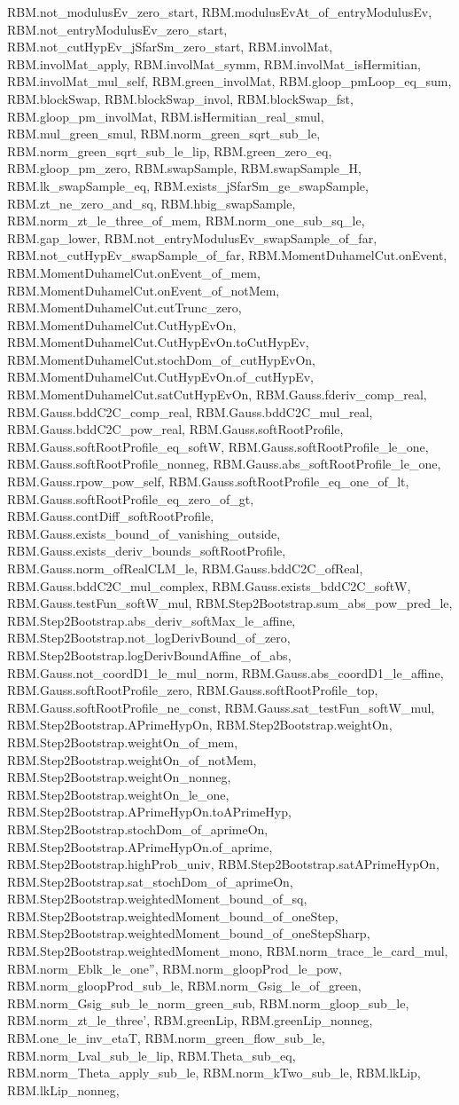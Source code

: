 \begin{theorem}
RBM.not_modulusEv_zero_start, RBM.modulusEvAt_of_entryModulusEv, RBM.not_entryModulusEv_zero_start, RBM.not_cutHypEv_jSfarSm_zero_start, RBM.involMat, RBM.involMat_apply, RBM.involMat_symm, RBM.involMat_isHermitian, RBM.involMat_mul_self, RBM.green_involMat, RBM.gloop_pmLoop_eq_sum, RBM.blockSwap, RBM.blockSwap_invol, RBM.blockSwap_fst, RBM.gloop_pm_involMat, RBM.isHermitian_real_smul, RBM.mul_green_smul, RBM.norm_green_sqrt_sub_le, RBM.norm_green_sqrt_sub_le_lip, RBM.green_zero_eq, RBM.gloop_pm_zero, RBM.swapSample, RBM.swapSample_H, RBM.lk_swapSample_eq, RBM.exists_jSfarSm_ge_swapSample, RBM.zt_ne_zero_and_sq, RBM.hbig_swapSample, RBM.norm_zt_le_three_of_mem, RBM.norm_one_sub_sq_le, RBM.gap_lower, RBM.not_entryModulusEv_swapSample_of_far, RBM.not_cutHypEv_swapSample_of_far, RBM.MomentDuhamelCut.onEvent, RBM.MomentDuhamelCut.onEvent_of_mem, RBM.MomentDuhamelCut.onEvent_of_notMem, RBM.MomentDuhamelCut.cutTrunc_zero, RBM.MomentDuhamelCut.CutHypEvOn, RBM.MomentDuhamelCut.CutHypEvOn.toCutHypEv, RBM.MomentDuhamelCut.stochDom_of_cutHypEvOn, RBM.MomentDuhamelCut.CutHypEvOn.of_cutHypEv, RBM.MomentDuhamelCut.satCutHypEvOn, RBM.Gauss.fderiv_comp_real, RBM.Gauss.bddC2C_comp_real, RBM.Gauss.bddC2C_mul_real, RBM.Gauss.bddC2C_pow_real, RBM.Gauss.softRootProfile, RBM.Gauss.softRootProfile_eq_softW, RBM.Gauss.softRootProfile_le_one, RBM.Gauss.softRootProfile_nonneg, RBM.Gauss.abs_softRootProfile_le_one, RBM.Gauss.rpow_pow_self, RBM.Gauss.softRootProfile_eq_one_of_lt, RBM.Gauss.softRootProfile_eq_zero_of_gt, RBM.Gauss.contDiff_softRootProfile, RBM.Gauss.exists_bound_of_vanishing_outside, RBM.Gauss.exists_deriv_bounds_softRootProfile, RBM.Gauss.norm_ofRealCLM_le, RBM.Gauss.bddC2C_ofReal, RBM.Gauss.bddC2C_mul_complex, RBM.Gauss.exists_bddC2C_softW, RBM.Gauss.testFun_softW_mul, RBM.Step2Bootstrap.sum_abs_pow_pred_le, RBM.Step2Bootstrap.abs_deriv_softMax_le_affine, RBM.Step2Bootstrap.not_logDerivBound_of_zero, RBM.Step2Bootstrap.logDerivBoundAffine_of_abs, RBM.Gauss.not_coordD1_le_mul_norm, RBM.Gauss.abs_coordD1_le_affine, RBM.Gauss.softRootProfile_zero, RBM.Gauss.softRootProfile_top, RBM.Gauss.softRootProfile_ne_const, RBM.Gauss.sat_testFun_softW_mul, RBM.Step2Bootstrap.APrimeHypOn, RBM.Step2Bootstrap.weightOn, RBM.Step2Bootstrap.weightOn_of_mem, RBM.Step2Bootstrap.weightOn_of_notMem, RBM.Step2Bootstrap.weightOn_nonneg, RBM.Step2Bootstrap.weightOn_le_one, RBM.Step2Bootstrap.APrimeHypOn.toAPrimeHyp, RBM.Step2Bootstrap.stochDom_of_aprimeOn, RBM.Step2Bootstrap.APrimeHypOn.of_aprime, RBM.Step2Bootstrap.highProb_univ, RBM.Step2Bootstrap.satAPrimeHypOn, RBM.Step2Bootstrap.sat_stochDom_of_aprimeOn, RBM.Step2Bootstrap.weightedMoment_bound_of_sq, RBM.Step2Bootstrap.weightedMoment_bound_of_oneStep, RBM.Step2Bootstrap.weightedMoment_bound_of_oneStepSharp, RBM.Step2Bootstrap.weightedMoment_mono, RBM.norm_trace_le_card_mul, RBM.norm_Eblk_le_one'', RBM.norm_gloopProd_le_pow, RBM.norm_gloopProd_sub_le, RBM.norm_Gsig_le_of_green, RBM.norm_Gsig_sub_le_norm_green_sub, RBM.norm_gloop_sub_le, RBM.norm_zt_le_three', RBM.greenLip, RBM.greenLip_nonneg, RBM.one_le_inv_etaT, RBM.norm_green_flow_sub_le, RBM.norm_Lval_sub_le_lip, RBM.Theta_sub_eq, RBM.norm_Theta_apply_sub_le, RBM.norm_kTwo_sub_le, RBM.lkLip, RBM.lkLip_nonneg, 
\end{theorem}
